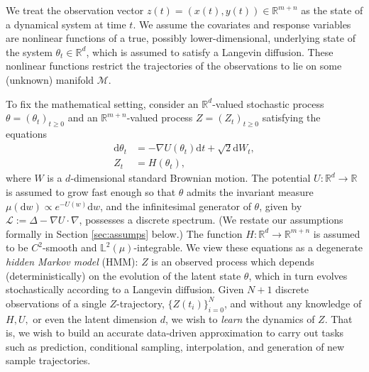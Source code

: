 \documentclass[11pt]{article}
\theoremstyle{plain}
\theoremstyle{definition}
\theoremstyle{remark}
\numberwithin{equation}{section}
\newcommand{\R}{\mathbb{R}}
\renewcommand{\L}{\mathscr{L}}
\renewcommand{\d}{\mathrm{d}}
\newcommand{\bL}{\mathbb{L}}
\begin{document}
We treat the observation vector $z(t)={(x(t),y(t)) \in \mathbb{R}^{m+n}}$ as the state of a dynamical system at time $t$. We assume the covariates and response variables are nonlinear functions of a true, possibly lower-dimensional, underlying state of the system $\theta_t \in \mathbb{R}^d$, which is assumed to satisfy a Langevin diffusion. These nonlinear functions restrict the trajectories of the observations to lie on some (unknown) manifold $\mathcal{M}$.  

To fix the mathematical setting, consider an $\R^d$-valued stochastic process $\theta=(\theta_t)_{t\ge 0}$ and an $\R^{m+n}$-valued process $Z=(Z_t)_{t\ge 0}$ satisfying the equations
\begin{align}
\d \theta_t&=-\nabla U(\theta_t)\d t+ \sqrt{2} \d W_t,\\
Z_t&=H(\theta_t),
\end{align}
where $W$ is a $d$-dimensional standard Brownian motion. The potential $U:\R^d\to \R$ is assumed to grow fast enough so that $\theta$ admits the invariant measure $\mu(\d w)\propto e^{-U(w)}\d w$, and the infinitesimal generator of $\theta$, given by $\L:=\Delta-\nabla U\cdot \nabla$, possesses a discrete spectrum. (We restate our assumptions formally in Section \ref{sec:assumps} below.) The function ${H:\R^d\to\R^{m+n}}$ is assumed to be $C^2$-smooth and $\bL^2(\mu)$-integrable. We view these equations as a degenerate
\emph{hidden Markov model} (HMM): $Z$ is an observed process which depends (deterministically) on the evolution of the latent state $\theta$, which in turn evolves stochastically according to a Langevin diffusion. Given $N+1$ discrete observations of a single $Z$-trajectory, $\{Z(t_i)\}_{i=0}^N$, and without any knowledge of $H,U,$ or even the latent dimension $d$, we wish to \emph{learn} the dynamics of $Z$. That is, we wish to build an accurate data-driven approximation to carry out tasks such as prediction, conditional sampling, interpolation, and generation of new sample trajectories. 
\end{document}
